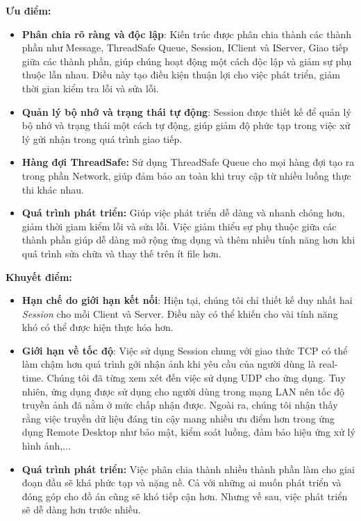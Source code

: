 \textbf{Ưu điểm: }
\begin{itemize}
	\item \textbf{Phân chia rõ ràng và độc lập}: Kiến trúc được phân chia thành các thành phần như Message, ThreadSafe Queue, Session, IClient và IServer, Giao tiếp giữa các thành phần, giúp chúng hoạt động một cách độc lập và giảm sự phụ thuộc lẫn nhau. Điều này tạo điều kiện thuận lợi cho việc phát triển, giảm thời gian kiểm tra lỗi và sửa lỗi.
	\item \textbf{Quản lý bộ nhớ và trạng thái tự động}: Session được thiết kế để quản lý bộ nhớ và trạng thái một cách tự động, giúp giảm độ phức tạp trong việc xử lý gửi nhận trong quá trình giao tiếp.
	\item \textbf{Hàng đợi ThreadSafe:} Sử dụng ThreadSafe Queue cho mọi hàng đợi tạo ra trong phần Network, giúp đảm bảo an toàn khi truy cập từ nhiều luồng thực thi khác nhau.
	\item \textbf{Quá trình phát triển: } Giúp việc phát triển dễ dàng và nhanh chóng hơn, giảm thời giam kiểm lỗi và sửa lỗi. Việc giảm thiểu sự phụ thuộc giữa các thành phần giúp dễ dàng mở rộng ứng dụng và thêm nhiều tính năng hơn khi quá trình sửa chữa và thay thế trên ít file hơn.
\end{itemize}

\textbf{Khuyết điểm: }
\begin{itemize}
	\item \textbf{Hạn chế do giới hạn kết nối}: Hiện tại, chúng tôi chỉ thiết kế duy nhất hai \textit{Session} cho mỗi Client và Server. Điều này có thể khiến cho vài tính năng khó có thể được hiện thực hóa hơn. 
	\item \textbf{Giới hạn về tốc độ}: Việc sử dụng Session chung với giao thức TCP có thể làm chậm hơn quá trình gởi nhận ảnh khi yêu cầu của người dùng là real-time. Chúng tôi đã từng xem xét đến việc sử dụng UDP cho ứng dụng. Tuy nhiên, ứng dụng được sử dụng cho người dùng trong mạng LAN nên tốc độ truyền ảnh đã nằm ở mức chấp nhận được. Ngoài ra, chúng tôi nhận thấy rằng việc truyền dữ liệu đáng tin cậy mang nhiều ưu điểm hơn trong ứng dụng Remote Desktop như bảo mật, kiểm soát luồng, đảm bảo hiệu ứng xử lý hình ảnh,...
	\item \textbf{Quá trình phát triển: } Việc phân chia thành nhiều thành phần làm cho giai đoạn đầu sẽ khá phức tạp và nặng nề. Cả với những ai muốn phát triển và đóng góp cho đồ án cũng sẽ khó tiếp cận hơn. Nhưng về sau, việc phát triển sẽ dễ dàng hơn trước nhiều.
\end{itemize}



